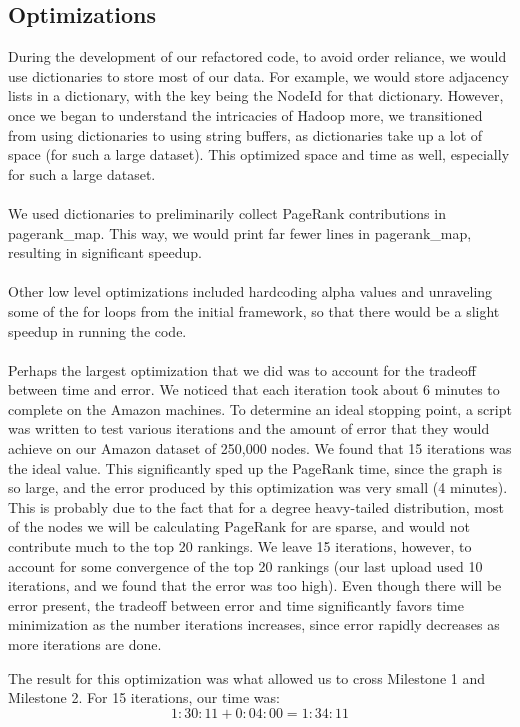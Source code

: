 \subsection*{Optimizations}
During the development of our refactored code, to avoid order reliance, we would use dictionaries to store most of our data. For example, we would store adjacency lists in a dictionary, with the key being the NodeId for that dictionary. However, once we began to understand the intricacies of Hadoop more, we transitioned from using dictionaries to using string buffers, as dictionaries take up a lot of space (for such a large dataset). This optimized space and time as well, especially for such a large dataset.
\\ \\
We used dictionaries to preliminarily collect PageRank contributions in pagerank\_map. This way, we would print far fewer lines in pagerank\_map, resulting in significant speedup.
\\\\
Other low level optimizations included hardcoding alpha values and unraveling some of the for loops from the initial framework, so that there would be a slight speedup in running the code.
\\ \\
Perhaps the largest optimization that we did was to account for the tradeoff between time and error. We noticed that each iteration took about 6 minutes to complete on the Amazon machines. To determine an ideal stopping point, a script was written to test various iterations and the amount of error that they would achieve on our Amazon dataset of 250,000 nodes. We found that 15 iterations was the ideal value. This significantly sped up the PageRank time, since the graph is so large, and the error produced by this optimization was very small (4 minutes). This is probably due to the fact that for a degree heavy-tailed distribution, most of the nodes we will be calculating PageRank for are sparse, and would not contribute much to the top 20 rankings. We leave 15 iterations, however, to account for some convergence of the top 20 rankings (our last upload used 10 iterations, and we found that the error was too high). Even though there will be error present, the tradeoff between error and time significantly favors time minimization as the number iterations increases, since error rapidly decreases as more iterations are done.

The result for this optimization was what allowed us to cross Milestone 1 and Milestone 2. For 15 iterations, our time was: $$1:30:11 + 0:04:00 = 1:34:11$$

